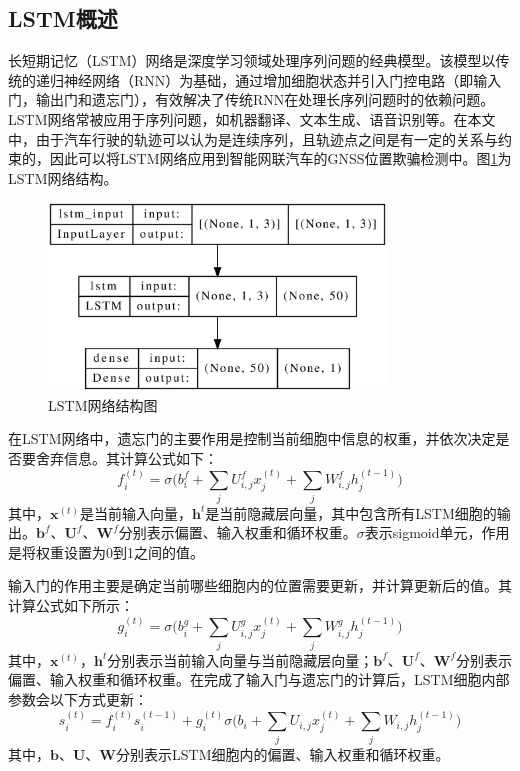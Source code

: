\subsection{LSTM概述}
\label{sec:LSTM_gaishu}
长短期记忆（LSTM）网络是深度学习领域处理序列问题的经典模型。该模型以传统的递归神经网络（RNN）为基础，通过增加细胞状态并引入门控电路（即输入门，输出门和遗忘门），有效解决了传统RNN在处理长序列问题时的依赖问题。LSTM网络常被应用于序列问题，如机器翻译、文本生成、语音识别等。在本文中，由于汽车行驶的轨迹可以认为是连续序列，且轨迹点之间是有一定的关系与约束的，因此可以将LSTM网络应用到智能网联汽车的GNSS位置欺骗检测中。图\ref{fig:LSTM_arch}为LSTM网络结构。

\begin{figure}[htbp]
    \begin{center}
        \includegraphics[width=0.8\textwidth]{../graphics/LSTM.eps}
        \caption{LSTM网络结构图}
        \label{fig:LSTM_arch}
    \end{center}
\end{figure}

在LSTM网络中，遗忘门的主要作用是控制当前细胞中信息的权重，并依次决定是否要舍弃信息。其计算公式如下：
\begin{equation}
    f_i^{(t)}=\sigma\bigg(b_i^f+\sum_jU_{i,j}^fx_j^(t)+\sum_jW_{i,j}^fh_j^{(t-1)}\bigg)
    \label{eq:3}
\end{equation}
其中，$\textbf{x}^{(t)}$是当前输入向量，$\textbf{h}^t$是当前隐藏层向量，其中包含所有LSTM细胞的输出。$\textbf{b}^f$、$\textbf{U}^f$、$\textbf{W}^f$分别表示偏置、输入权重和循环权重。$\sigma$表示sigmoid单元，作用是将权重设置为0到1之间的值。

输入门的作用主要是确定当前哪些细胞内的位置需要更新，并计算更新后的值。其计算公式如下所示：
\begin{equation}
    g_i^{(t)}=\sigma\bigg(b_i^g+\sum_jU_{i,j}^gx_j^{(t)}+\sum_jW_{i,j}^gh_j^{(t-1)}\bigg)
    \label{eq:4}
\end{equation}
其中，$\textbf{x}^{(t)}$，$\textbf{h}^t$分别表示当前输入向量与当前隐藏层向量；$\textbf{b}^f$、$\textbf{U}^f$、$\textbf{W}^f$分别表示偏置、输入权重和循环权重。在完成了输入门与遗忘门的计算后，LSTM细胞内部参数会以下方式更新：
\begin{equation}
    s_i^{(t)}=f_i^{(t)}s_i^{(t-1)}+g_i^{(t)}\sigma\bigg(b_i+\sum_jU_{i,j}x_j^{(t)}+\sum_jW_{i,j}h_j^{(t-1)}\bigg)
    \label{eq:5}
\end{equation}
其中，$\textbf{b}$、$\textbf{U}$、$\textbf{W}$分别表示LSTM细胞内的偏置、输入权重和循环权重。

